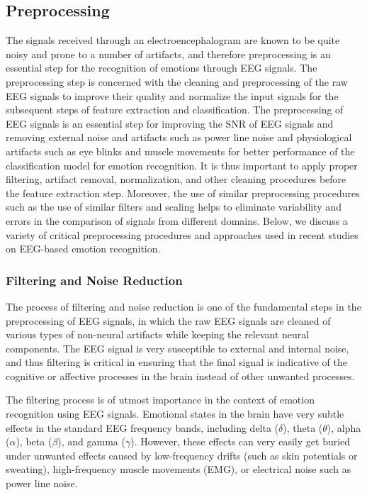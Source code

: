 \documentclass{WileyMSP-template}
\begin{document}
\subsection{Preprocessing}
The signals received through an electroencephalogram are known to be quite noisy and prone to a number of artifacts, and therefore preprocessing is an essential step for the recognition of emotions through EEG signals. The preprocessing step is concerned with the cleaning and preprocessing of the raw EEG signals to improve their quality and normalize the input signals for the subsequent steps of feature extraction and classification. The preprocessing of EEG signals is an essential step for improving the SNR of EEG signals and removing external noise and artifacts such as power line noise and physiological artifacts such as eye blinks and muscle movements for better performance of the classification model for emotion recognition. It is thus important to apply proper filtering, artifact removal, normalization, and other cleaning procedures before the feature extraction step. Moreover, the use of similar preprocessing procedures such as the use of similar filters and scaling helps to eliminate variability and errors in the comparison of signals from different domains. Below, we discuss a variety of critical preprocessing procedures and approaches used in recent studies on EEG-based emotion recognition.

\subsubsection{Filtering and Noise Reduction}

The process of filtering and noise reduction is one of the fundamental steps in the preprocessing of EEG signals, in which the raw EEG signals are cleaned of various types of non-neural artifacts while keeping the relevant neural components. The EEG signal is very susceptible to external and internal noise, and thus filtering is critical in ensuring that the final signal is indicative of the cognitive or affective processes in the brain instead of other unwanted processes.

The filtering process is of utmost importance in the context of emotion recognition using EEG signals. Emotional states in the brain have very subtle effects in the standard EEG frequency bands, including delta ($\delta$), theta ($\theta$), alpha ($\alpha$), beta ($\beta$), and gamma ($\gamma$). However, these effects can very easily get buried under unwanted effects caused by low-frequency drifts (such as skin potentials or sweating), high-frequency muscle movements (EMG), or electrical noise such as power line noise.
\end{document}
